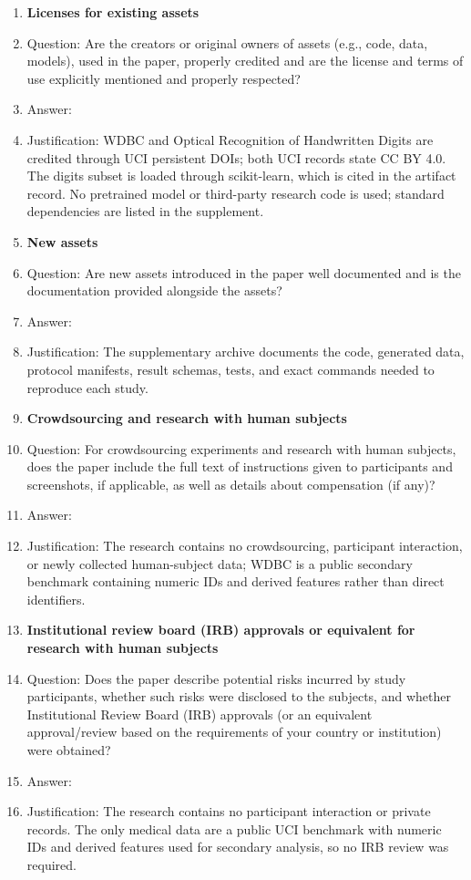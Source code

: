 \begin{enumerate}
\item {\bf Licenses for existing assets}
    \item[] Question: Are the creators or original owners of assets (e.g., code, data, models), used in the paper, properly credited and are the license and terms of use explicitly mentioned and properly respected?
    \item[] Answer: \answerYes{}
    \item[] Justification: WDBC and Optical Recognition of Handwritten Digits are credited through UCI persistent DOIs; both UCI records state CC BY 4.0. The digits subset is loaded through scikit-learn, which is cited in the artifact record. No pretrained model or third-party research code is used; standard dependencies are listed in the supplement.

\item {\bf New assets}
    \item[] Question: Are new assets introduced in the paper well documented and is the documentation provided alongside the assets?
    \item[] Answer: \answerYes{}
    \item[] Justification: The supplementary archive documents the code, generated data, protocol manifests, result schemas, tests, and exact commands needed to reproduce each study.

\item {\bf Crowdsourcing and research with human subjects}
    \item[] Question: For crowdsourcing experiments and research with human subjects, does the paper include the full text of instructions given to participants and screenshots, if applicable, as well as details about compensation (if any)?
    \item[] Answer: \answerNA{}
    \item[] Justification: The research contains no crowdsourcing, participant interaction, or newly collected human-subject data; WDBC is a public secondary benchmark containing numeric IDs and derived features rather than direct identifiers.

\item {\bf Institutional review board (IRB) approvals or equivalent for research with human subjects}
    \item[] Question: Does the paper describe potential risks incurred by study participants, whether such risks were disclosed to the subjects, and whether Institutional Review Board (IRB) approvals (or an equivalent approval/review based on the requirements of your country or institution) were obtained?
    \item[] Answer: \answerNA{}
    \item[] Justification: The research contains no participant interaction or private records. The only medical data are a public UCI benchmark with numeric IDs and derived features used for secondary analysis, so no IRB review was required.


\end{enumerate}

